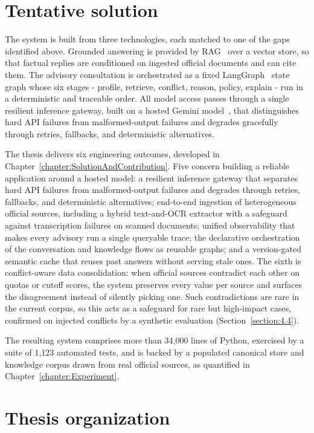 \documentclass[../main.tex]{subfiles}
\begin{document}
\section{Tentative solution}
\label{section:1.3}

The system is built from three technologies, each matched to one of the gaps identified above.
Grounded answering is provided by \gls{RAG}~\cite{lewis2020rag} over a vector store, so that factual replies are conditioned on ingested official documents and can cite them.
The advisory consultation is orchestrated as a fixed LangGraph~\cite{langgraph} state graph whose six stages - profile, retrieve, conflict, reason, policy, explain - run in a deterministic and traceable order.
All model access passes through a single resilient inference gateway, built on a hosted Gemini model~\cite{gemini}, that distinguishes hard \gls{API} failures from malformed-output failures and degrades gracefully through retries, fallbacks, and deterministic alternatives.

The thesis delivers six engineering outcomes, developed in Chapter~\ref{chapter:SolutionAndContribution}.
Five concern building a reliable application around a hosted model: a resilient inference gateway that separates hard \gls{API} failures from malformed-output failures and degrades through retries, fallbacks, and deterministic alternatives; end-to-end ingestion of heterogeneous official sources, including a hybrid text-and-\gls{OCR} extractor with a safeguard against transcription failures on scanned documents; unified observability that makes every advisory run a single queryable trace; the declarative orchestration of the conversation and knowledge flows as reusable graphs; and a version-gated semantic cache that reuses past answers without serving stale ones.
The sixth is conflict-aware data consolidation: when official sources contradict each other on quotas or cutoff scores, the system preserves every value per source and surfaces the disagreement instead of silently picking one.
Such contradictions are rare in the current corpus, so this acts as a safeguard for rare but high-impact cases, confirmed on injected conflicts by a synthetic evaluation (Section~\ref{section:4.4}).

The resulting system comprises more than 34{,}000 lines of Python, exercised by a suite of 1{,}123 automated tests, and is backed by a populated canonical store and knowledge corpus drawn from real official sources, as quantified in Chapter~\ref{chapter:Experiment}.

\section{Thesis organization}
\label{section:1.4}
\end{document}
